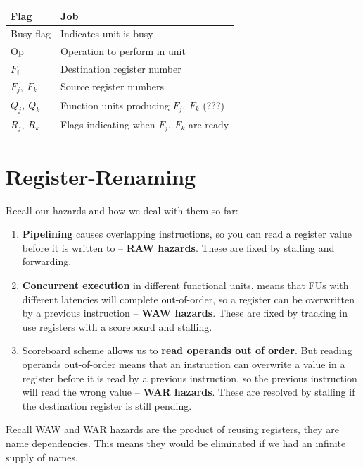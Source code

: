 \documentclass{article}
\begin{document}
\begin{tabular}{ll}
\textbf{Flag} & \textbf{Job} \\
\toprule
Busy flag & Indicates unit is busy \\
Op & Operation to perform in unit \\
$F_i$ & Destination register number \\
$F_j,\ F_k$ & Source register numbers \\
$Q_j,\ Q_k$ & Function units producing $F_j,\ F_k$ (???) \\
$R_j,\ R_k$ & Flags indicating when $F_j,\ F_k$ are ready \\

\bottomrule
\end{tabular}


\section{Register-Renaming}

Recall our hazards and how we deal with them so far:

\begin{enumerate}

\item \textbf{Pipelining} causes overlapping instructions, so you can read a register value before it is written to -- \textbf{RAW hazards}. These are fixed by stalling and forwarding.

\item \textbf{Concurrent execution} in different functional units, means that FUs with different latencies will complete out-of-order, so a register can be overwritten by a previous instruction -- \textbf{WAW hazards}. These are fixed by tracking in use registers with a scoreboard and stalling.

\item Scoreboard scheme allows us to \textbf{read operands out of order}. But reading operands out-of-order means that an instruction can overwrite a value in a register before it is read by a previous instruction, so the previous instruction will read the wrong value -- \textbf{WAR hazards}. These are resolved by stalling if the destination register is still pending.

\end{enumerate}

Recall WAW and WAR hazards are the product of reusing registers, they are name dependencies. This means they would be eliminated if we had an infinite supply of names. 
\end{document}
